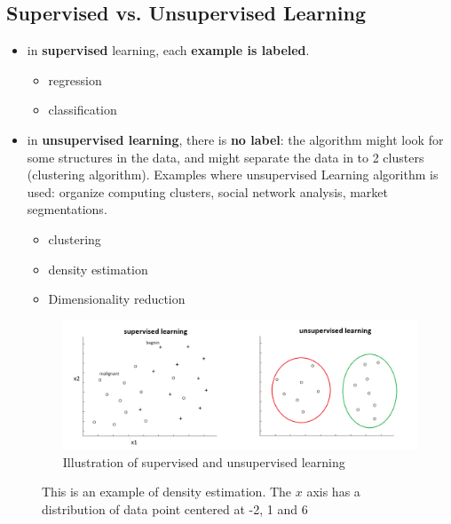 \documentclass[a4paper,12pt]{report}
\begin{document}
\subsection{Supervised vs. Unsupervised Learning}
\begin{itemize}
\item in \textbf{supervised} learning, each \textbf{example is labeled}.
	\begin{itemize}
		\item regression
		\item classification
	\end{itemize}
\item in \textbf{unsupervised learning}, there is \textbf{no label}: the algorithm might look for some structures in the data, and might separate the data in to 2 clusters (clustering algorithm). Examples where unsupervised Learning algorithm is used: organize computing clusters, social network analysis, market segmentations. 
\begin{itemize}
	\item clustering
	\item density estimation
	\item Dimensionality reduction
\end{itemize}
\begin{figure}[H]
\centering
        \includegraphics[totalheight=4 cm]{supervisedVSunsuper.png}
						\caption{
								\label{superVSunsuper} Illustration of supervised and unsupervised learning}
\end{figure}
\end{itemize}
\begin{figure}
\centering
{}
\caption{This is an example of density estimation. The $x$ axis has a distribution of data point centered at -2, 1 and 6}
\end{figure}
\end{document}
